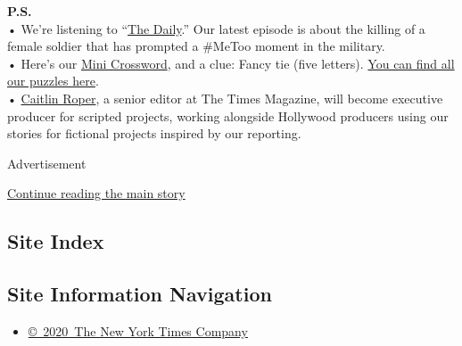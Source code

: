 \textbf{P.S.}\\
• We're listening to
``\href{https://www.nytimes3xbfgragh.onion/2020/07/31/podcasts/the-daily/vanessa-guillen-military-metoo.html}{The
Daily}.'' Our latest episode is about the killing of a female soldier
that has prompted a \#MeToo moment in the military.\\
• Here's our
\href{https://www.nytimes3xbfgragh.onion/crosswords/game/mini}{Mini
Crossword}, and a clue: Fancy tie (five letters).
\href{https://www.nytimes3xbfgragh.onion/crosswords}{You can find all
our puzzles here}.\\
•
\href{https://www.nytco.com/press/caitlin-roper-named-executive-producer-for-scripted-projects/}{Caitlin
Roper}, a senior editor at The Times Magazine, will become executive
producer for scripted projects, working alongside Hollywood producers
using our stories for fictional projects inspired by our reporting.

Advertisement

\protect\hyperlink{after-bottom}{Continue reading the main story}

\hypertarget{site-index}{%
\subsection{Site Index}\label{site-index}}

\hypertarget{site-information-navigation}{%
\subsection{Site Information
Navigation}\label{site-information-navigation}}

\begin{itemize}
\tightlist
\item
  \href{https://help.nytimes3xbfgragh.onion/hc/en-us/articles/115014792127-Copyright-notice}{©~2020~The
  New York Times Company}
\end{itemize}

